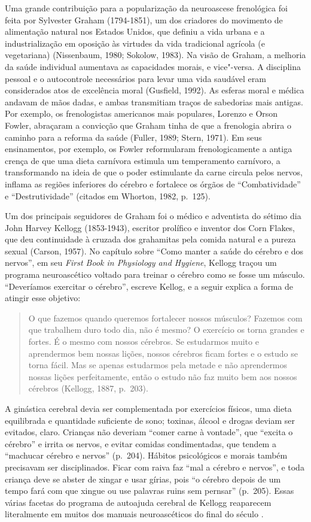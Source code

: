 Uma grande contribuição para a popularização da neuroascese frenológica
foi feita por Sylvester Graham (1794-1851), um dos criadores do
movimento de alimentação natural nos Estados Unidos, que definiu a vida
urbana e a industrialização em oposição às virtudes da vida tradicional
agrícola (e vegetariana) (Nissenbaum, 1980; Sokolow, 1983). Na visão de
Graham, a melhoria da saúde individual aumentava as capacidades morais,
e vice"-versa. A disciplina pessoal e o autocontrole necessários para
levar uma vida saudável eram considerados atos de excelência moral
(Gusfield, 1992). As esferas moral e médica andavam de mãos dadas, e
ambas transmitiam traços de sabedorias mais antigas. Por exemplo, os
frenologistas americanos mais populares, Lorenzo e Orson Fowler,
abraçaram a convicção que Graham tinha de que a frenologia abrira o
caminho para a reforma da saúde (Fuller, 1989; Stern, 1971). Em seus
ensinamentos, por exemplo, os Fowler reformularam frenologicamente a
antiga crença de que uma dieta carnívora estimula um temperamento
carnívoro, a transformando na ideia de que o poder estimulante da carne
circula pelos nervos, inflama as regiões inferiores do cérebro e
fortalece os órgãos de ``Combatividade'' e ``Destrutividade'' (citados
em Whorton, 1982, p.~125).

Um dos principais seguidores de Graham foi o médico e adventista do
sétimo dia John Harvey Kellogg (1853-1943), escritor prolífico e
inventor dos Corn Flakes, que deu continuidade à cruzada dos grahamitas
pela comida natural e a pureza sexual (Carson, 1957). No capítulo sobre
``Como manter a saúde do cérebro e dos nervos'', em seu \emph{First Book
in Physiology and Hygiene}, Kellogg traçou um programa neuroascético
voltado para treinar o cérebro como se fosse um músculo. ``Deveríamos
exercitar o cérebro'', escreve Kellog, e a seguir explica a forma de
atingir esse objetivo:

\begin{quote}
O que fazemos quando queremos fortalecer nossos músculos? Fazemos com
que trabalhem duro todo dia, não é mesmo? O exercício os torna grandes e
fortes. É o mesmo com nossos cérebros. Se estudarmos muito e aprendermos
bem nossas lições, nossos cérebros ficam fortes e o estudo se torna
fácil. Mas se apenas estudarmos pela metade e não aprendermos nossas
lições perfeitamente, então o estudo não faz muito bem aos nossos
cérebros (Kellogg, 1887, p.~203).
\end{quote}

A ginástica cerebral devia ser complementada por exercícios físicos, uma
dieta equilibrada e quantidade suficiente de sono; toxinas, álcool e
drogas deviam ser evitados, claro. Crianças não deveriam ``comer carne à
vontade'', que ``excita o cérebro'' e irrita os nervos, e evitar comidas
condimentadas, que tendem a ``machucar cérebro e nervos'' (p.~204).
Hábitos psicológicos e morais também precisavam ser disciplinados. Ficar
com raiva faz ``mal a cérebro e nervos'', e toda criança deve se abster
de xingar e usar gírias, pois ``o cérebro depois de um tempo fará com
que xingue ou use palavras ruins sem pernsar'' (p.~205). Essas várias
facetas do programa de autoajuda cerebral de Kellogg reaparecem
literalmente em muitos dos manuais neuroascéticos do final do século .

